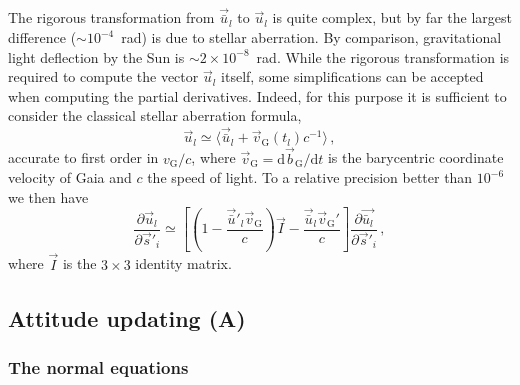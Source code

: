 \documentclass[structabstract]{aa}
\begin{document}
The rigorous transformation from $\vec{\bar{u}}_l$ to $\vec{u}_l$ is quite
complex, but by far the largest difference ($\sim\! 10^{-4}$~rad) is due to
stellar aberration. By comparison, gravitational light deflection by the Sun
is $\sim\! 2\times 10^{-8}$~rad. While the rigorous transformation is
required to compute the vector $\vec{u}_l$ itself, some simplifications can
be accepted when computing the partial derivatives. Indeed, for this purpose
it is sufficient to consider the classical stellar aberration formula,
\begin{equation}\label{eq:classAberr}
\vec{u}_l \simeq \langle \vec{\bar{u}}_l + \vec{v}_\text{G}(t_l)c^{-1} \rangle \, ,
\end{equation}
accurate to first order in $v_\text{G}/c$, 
where $\vec{v}_\text{G}=\text{d}\vec{b}_\text{G}/\text{d}t$ is the barycentric 
coordinate velocity of Gaia and $c$ the speed of light. To a relative precision 
better than $10^{-6}$ we then have
\begin{equation}\label{eq:duds}
\frac{\partial\vec{u}_l}{\partial\vec{s}'_{\!i}} \simeq 
\left[\left(1-\frac{\vec{\bar{u}}'_l\vec{v}_\text{G}}{c}\right)\vec{I}
-\frac{\vec{\bar{u}}_l\vec{v}_\text{G}'}{c}\right]
\frac{\partial\vec{\bar{u}_l}}{\partial\vec{s}'_{\!i}} \, ,
\end{equation}
where $\vec{I}$ is the $3\times 3$ identity matrix.

\subsection{Attitude updating (A)} \label{sec:attitudeupdate}

\subsubsection{The normal equations}\label{sec:att-normals}
\end{document}
